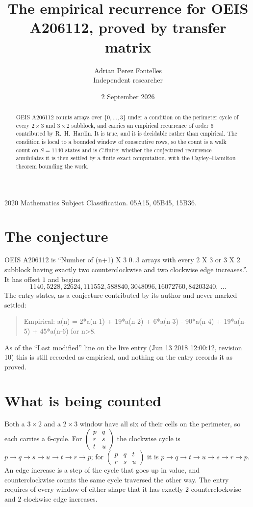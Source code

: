\documentclass[11pt,a4paper]{article}
\title{The empirical recurrence for OEIS A206112, proved by transfer matrix}
\author{Adrian Perez Fontelles\\ \small Independent researcher}
\date{2 September 2026}
\theoremstyle{plain}
\theoremstyle{definition}
\begin{document}
\maketitle

\begin{abstract}
OEIS A206112 counts arrays over $\{0,\dots,3\}$ under a condition on the perimeter cycle of
every $2\times3$ and $3\times2$ subblock, and carries an empirical recurrence of order $6$ contributed by
R.~H.~Hardin. It is true, and it is decidable rather than empirical. The condition is local to
a bounded window of consecutive rows, so the count is a walk count on $S=1140$ states and is
$C$-finite; whether the conjectured recurrence annihilates it is then settled by a finite exact
computation, with the Cayley--Hamilton theorem bounding the work.
\end{abstract}

\noindent\small 2020 Mathematics Subject Classification. 05A15, 05B45, 15B36.\normalsize

\section{The conjecture}

OEIS A206112 is ``Number of (n+1) X 3 0..3 arrays with every 2 X 3 or 3 X 2 subblock having exactly two counterclockwise and two clockwise edge increases.''. It has offset $1$ and begins
\[
1140, 5228, 22624, 111552, 588840, 3048096, 16072760, 84203240,\ \dots
\]
The entry states, as a conjecture contributed by its author and never marked settled:
\begin{quote}
Empirical: a(n) = 2*a(n-1) + 19*a(n-2) + 6*a(n-3) - 90*a(n-4) + 19*a(n-5) + 45*a(n-6) for n>8.
\end{quote}
As of the ``Last modified'' line on the live entry (Jun 13 2018 12:00:12, revision 10) this is still
recorded as empirical, and nothing on the entry records it as proved.

\section{What is being counted}

Both a $3\times2$ and a $2\times3$ window have all six of their cells on the
perimeter, so each carries a $6$-cycle. For
$\begin{pmatrix}p&q\\r&s\\t&u\end{pmatrix}$ the clockwise cycle is
$p\to q\to s\to u\to t\to r\to p$; for
$\begin{pmatrix}p&q&t\\r&s&u\end{pmatrix}$ it is
$p\to q\to t\to u\to s\to r\to p$. An edge increase is a step of the cycle that goes up in
value, and counterclockwise counts the same cycle traversed the other way. The entry requires
of every window of either shape that it has exactly $2$ counterclockwise and $2$ clockwise edge increases.
\end{document}
